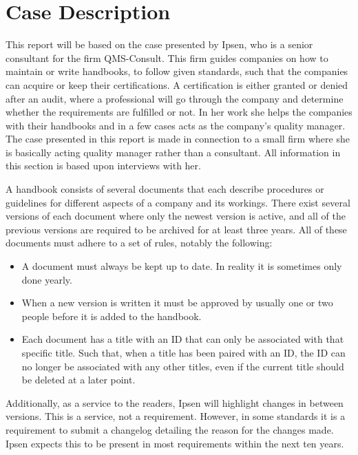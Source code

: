 \section{Case Description} \label{sec:CaseDescription}

This report will be based on the case presented by Ipsen, who is a senior consultant for the firm QMS-Consult.
This firm guides companies on how to maintain or write handbooks, to follow given standards, such that the companies can acquire or keep their certifications.
A certification is either granted or denied after an audit, where a professional will go through the company and determine whether the requirements are fulfilled or not.
In her work she helps the companies with their handbooks and in a few cases acts as the company's quality manager.
The case presented in this report is made in connection to a small firm where she is basically acting quality manager rather than a consultant.
All information in this section is based upon interviews with her.

A handbook consists of several documents that each describe procedures or guidelines for different aspects of a company and its workings.
There exist several versions of each document where only the newest version is active, and all of the previous versions are required to be archived for at least three years.
All of these documents must adhere to a set of rules, notably the following:

\begin{itemize}
	\item
	A document must always be kept up to date.
	In reality it is sometimes only done yearly.
	\item
	When a new version is written it must be approved by usually one or two people before it is added to the handbook.
	\item
	Each document has a title with an ID that can only be associated with that specific title.
	Such that, when a title has been paired with an ID, the ID can no longer be associated with any other titles, even if the current title should be deleted at a later point.
\end{itemize}

Additionally, as a service to the readers, Ipsen will highlight changes in between versions.
This is a service, not a requirement.
However, in some standards it is a requirement to submit a changelog detailing the reason for the changes made.
Ipsen expects this to be present in most requirements within the next ten years.

